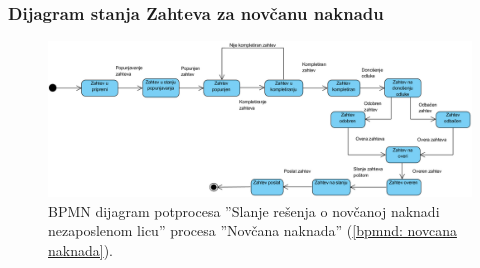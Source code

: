 \begin{mylandscape}
\subsubsection{Dijagram stanja Zahteva za nov\v canu naknadu}
	\begin{figure}[H]
		\centering
		\includegraphics[width=0.6\paperwidth]{dijagrami/dijagrami-stanja/novcana-naknada.png}
		\caption{BPMN dijagram potprocesa ''Slanje re\v senja o nov\v canoj naknadi nezaposlenom licu'' procesa ''Nov\v cana naknada'' (\ref{bpmnd: novcana naknada}).}
	\end{figure}
	
	
\end{mylandscape}

